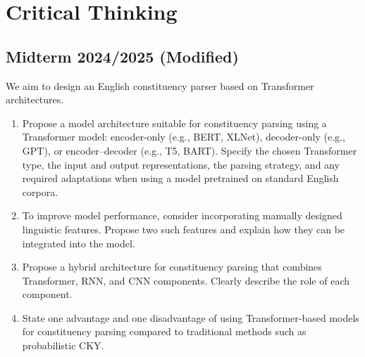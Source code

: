 \documentclass{../extra/aakpract/aakpract}
\begin{document}
	\section{Critical Thinking}
	
	\subsection{Midterm 2024/2025 (Modified)}
	
	We aim to design an English constituency parser based on Transformer architectures. 
	
	\begin{enumerate}
		\item Propose a model architecture suitable for constituency parsing using a Transformer model: encoder-only (e.g., BERT, XLNet), decoder-only (e.g., GPT), or encoder–decoder (e.g., T5, BART). 
		Specify the chosen Transformer type, the input and output representations, the parsing strategy, and any required adaptations when using a model pretrained on standard English corpora.
		
		\item To improve model performance, consider incorporating manually designed linguistic features. 
		Propose two such features and explain how they can be integrated into the model.
		
		\item Propose a hybrid architecture for constituency parsing that combines Transformer, RNN, and CNN components. 
		Clearly describe the role of each component.
		
		\item State one advantage and one disadvantage of using Transformer-based models for constituency parsing compared to traditional methods such as probabilistic CKY.
	\end{enumerate}
	
	
\end{document}
